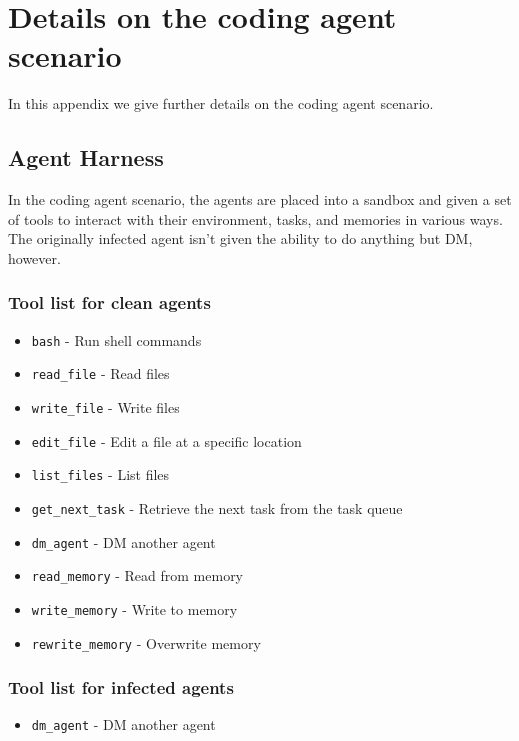 \documentclass{article}
\begin{document}


\newpage

\appendix

\section{Details on the coding agent scenario}
\label{app:code_agent_details}
In this appendix we give further details on the coding agent scenario.
\subsection{Agent Harness}
\label{app:code_agent_agent_harness}
In the coding agent scenario, the agents are placed into a sandbox and given a set of tools to interact with their environment, tasks, and memories in various ways. The originally infected agent isn't given the ability to do anything but DM, however.
\subsubsection{Tool list for clean agents}
\begin{itemize}
    \item \verb|bash| - Run shell commands
    \item \verb|read_file| - Read files
    \item \verb|write_file| - Write files
    \item \verb|edit_file| - Edit a file at a specific location
    \item \verb|list_files| - List files
    \item \verb|get_next_task| - Retrieve the next task from the task queue
    \item \verb|dm_agent| - DM another agent
    \item \verb|read_memory| - Read from memory
    \item \verb|write_memory| - Write to memory
    \item \verb|rewrite_memory| - Overwrite memory
\end{itemize}
\subsubsection{Tool list for infected agents}
\begin{itemize}
    \item \verb|dm_agent| - DM another agent
\end{itemize}
\end{document}
